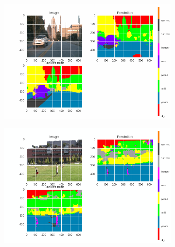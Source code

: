 \begin{figure}[p]
\begin{minipage}[c]{.95\textwidth}
\begin{subfigure}{.47\textwidth}
            \centering
            \includegraphics[trim={13 10mm 25mm 5mm},clip,width=\linewidth]{img/deconvLSTM/gatech_24_99-0.png}
            \caption{}\label{fig:deconvlstm_gatech_samples:c}
        \end{subfigure}
        \begin{subfigure}{.47\textwidth}
            \centering
            \includegraphics[trim={13 10mm 25mm 5mm},clip,width=\linewidth]{img/deconvLSTM/gatech_29_69-1.png}
            \caption{}\label{fig:deconvlstm_gatech_samples:d}
        \end{subfigure}
    \end{minipage}%
    \begin{minipage}[c]{.1\textwidth}

\end{minipage}
\end{figure}

